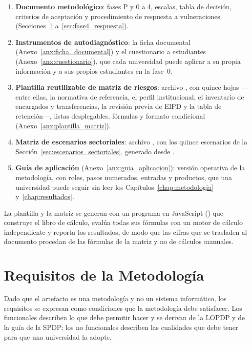 \begin{enumerate}
  \item \textbf{Documento metodológico}: fases P y 0 a 4, escalas, tabla de decisión, criterios de aceptación y procedimiento de respuesta a vulneraciones (Secciones~\ref{sec:requisitos_guia} a~\ref{sec:fase4_respuesta}).
  \item \textbf{Instrumentos de autodiagnóstico}: la ficha documental (Anexo~\ref{anx:ficha_documental}) y el cuestionario a estudiantes (Anexo~\ref{anx:cuestionario}), que cada universidad puede aplicar a su propia información y a sus propios estudiantes en la fase~0.
  \item \textbf{Plantilla reutilizable de matriz de riesgos}: archivo , con quince hojas ---entre ellas, la normativa de referencia, el perfil institucional, el inventario de encargados y transferencias, la revisión previa de EIPD y la tabla de retención---, listas desplegables, fórmulas y formato condicional (Anexo~\ref{anx:plantilla_matriz}).
  \item \textbf{Matriz de escenarios sectoriales}: archivo , con los quince escenarios de la Sección~\ref{sec:escenarios_sectoriales}, generado desde .
  \item \textbf{Guía de aplicación} (Anexo~\ref{anx:guia_aplicacion}): versión operativa de la metodología, con roles, pasos numerados, entradas y productos, que una universidad puede seguir sin leer los Capítulos~\ref{chap:metodologia} y~\ref{chap:resultados}.
\end{enumerate}

La plantilla y la matriz se generan con un programa en JavaScript () que construye el libro de cálculo, evalúa todas sus fórmulas con un motor de cálculo independiente y reporta los resultados, de modo que las cifras que se trasladen al documento procedan de las fórmulas de la matriz y no de cálculos manuales.

\section{Requisitos de la Metodología}
\label{sec:requisitos_guia}

Dado que el artefacto es una metodología y no un sistema informático, los requisitos se expresan como condiciones que la metodología debe satisfacer. Los funcionales describen lo que debe permitir hacer y se derivan de la LOPDP y de la guía de la SPDP; los no funcionales describen las cualidades que debe tener para que una universidad la adopte.

